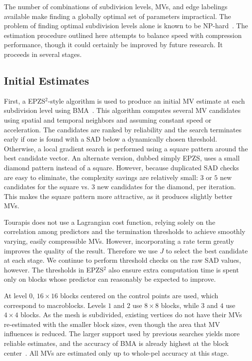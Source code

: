 \documentclass[11pt,letterpaper]{article}
\begin{document}
The number of combinations of subdivision levels, MVs, and edge labelings
 available make finding a globally optimal set of parameters impractical.
The problem of finding optimal subdivision levels alone is known to be
 NP-hard~\cite{AS94}.
The estimation procedure outlined here attempts to balance speed with
 compression performance, though it could certainly be improved by future
 research.
It proceeds in several stages.

\subsection{Initial Estimates}

First, a EPZS${}^2$-style algorithm is used to produce an initial MV estimate
 at each subdivision level using BMA~\cite{Tou02}.
This algorithm computes several MV candidates using spatial and temporal
 neighbors and assuming constant speed or acceleration.
The candidates are ranked by reliability and the search terminates early if one
 is found with a SAD below a dynamically chosen threshold.
Otherwise, a local gradient search is performed using a square pattern around
 the best candidate vector.
An alternate version, dubbed simply EPZS, uses a small diamond pattern instead
 of a square.
However, because duplicated SAD checks are easy to eliminate, the complexity
 savings are relatively small: $3$ or $5$ new candidates for the square vs.
 $3$ new candidates for the diamond, per iteration.
This makes the square pattern more attractive, as it produces slightly better
 MVs.

Tourapis does not use a Lagrangian cost function, relying solely on the
 correlation among predictors and the termination thresholds to achieve
 smoothly varying, easily compressible MVs.
However, incorporating a rate term greatly improves the quality of the result.
Therefore we use $J$ to select the best candidate at each stage.
We continue to perform threshold checks on the raw SAD values, however.
The thresholds in EPZS${}^2$ also ensure extra computation time is spent only
 on blocks whose predictor can reasonably be expected to improve.

At level $0$, $16\times 16$ blocks centered on the control points are used,
 which correspond to macroblocks.
Levels $1$ and $2$ use $8\times 8$ blocks, while $3$ and $4$ use $4\times 4$
 blocks.
As the mesh is subdivided, existing vertices do not have their MVs re-estimated
 with the smaller block sizes, even though the area that MV influences is
 reduced.
The larger support used by previous searches yields more reliable estimates,
 and the accuracy of BMA is already highest at the block center~\cite{ZSNKI02}.
All MVs are estimated only up to whole-pel accuracy at this stage.
\end{document}
